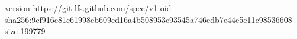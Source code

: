 version https://git-lfs.github.com/spec/v1
oid sha256:9cf916c81c61998eb609ed16a4b508953c93545a746edb7e44e5e11c98536608
size 199779
